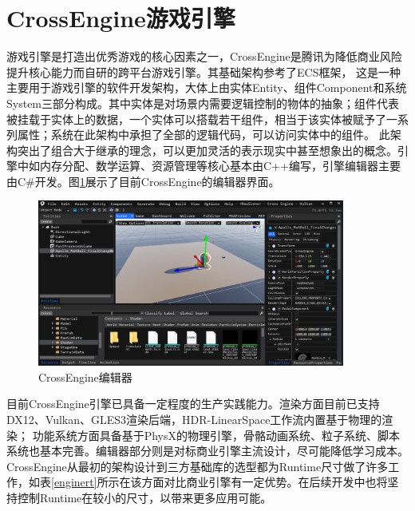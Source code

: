 \section{CrossEngine游戏引擎}
游戏引擎是打造出优秀游戏的核心因素之一，CrossEngine是腾讯为降低商业风险提升核心能力而自研的跨平台游戏引擎。其基础架构参考了ECS框架，
这是一种主要用于游戏引擎的软件开发架构，大体上由实体Entity、组件Component和系统System三部分构成\cite{ce1}。其中实体是对场景内需要逻辑控制的物体的抽象；组件代表被挂载于实体上的数据，一个实体可以搭载若干组件，相当于该实体被赋予了一系列属性；系统在此架构中承担了全部的逻辑代码，可以访问实体中的组件。
此架构突出了组合大于继承的理念，可以更加灵活的表示现实中甚至想象出的概念。引擎中如内存分配、数学运算、资源管理等核心基本由C++编写，引擎编辑器主要由C\#开发。图\ref{ceeditor}展示了目前CrossEngine的编辑器界面。
\begin{figure}[h!]
    \begin{center}
        \includegraphics[width=0.9\textwidth]{pictures/crossengine.png}
        \caption{CrossEngine编辑器}
        \label{ceeditor}
    \end{center}
\end{figure}
\par
目前CrossEngine引擎已具备一定程度的生产实践能力。渲染方面目前已支持DX12、Vulkan、GLES3渲染后端，HDR-LinearSpace工作流内置基于物理的渲染；
功能系统方面具备基于PhysX的物理引擎，骨骼动画系统、粒子系统、脚本系统也基本完善。编辑器部分则是对标商业引擎主流设计，尽可能降低学习成本。
CrossEngine从最初的架构设计到三方基础库的选型都为Runtime尺寸做了许多工作，如表\ref{enginert}所示在该方面对比商业引擎有一定优势。在后续开发中也将坚持控制Runtime在较小的尺寸，以带来更多应用可能。
